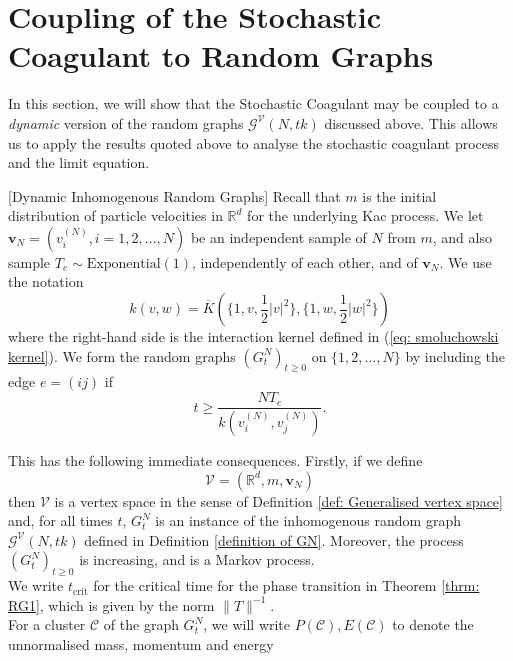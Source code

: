 \section{Coupling of the Stochastic Coagulant to Random Graphs} \label{sec: coupling_to_random_graph}
In this section, we will show that the Stochastic Coagulant may be coupled to a \emph{dynamic} version of the random graphs $\mathcal{G}^\mathcal{V}(N,tk)$ discussed above. This allows us to apply the results quoted above to analyse the stochastic coagulant process and the limit equation.
\begin{definition}\label{def: GNT}[Dynamic Inhomogenous Random Graphs] Recall that $m$ is the initial distribution of particle velocities in $\mathbb{R}^d$ for the underlying Kac process. We let $\mathbf{v}_N=(v^{(N)}_i, i=1,2,...,N)$ be an independent sample of $N$ from $m$, and also sample $T_e \sim \text{Exponential}(1)$, independently of each other, and of $\mathbf{v}_N$. We use the notation \begin{equation} k(v,w)=\overline{K}\left(\{1,v, \frac{1}{2}|v|^2\},\{1,w, \frac{1}{2}|w|^2\}\right) \end{equation} where the right-hand side is the interaction kernel defined in (\ref{eq: smoluchowski kernel}). We form the random graphs $(G^N_t)_{t \ge 0}$ on $\{1,2,...,N\}$ by including the edge $e=(ij)$ if \begin{equation}
    t\ge \frac{N T_e}{k\left(v^{(N)}_i,v^{(N)}_j\right)}.
\end{equation}  \end{definition} This has the following immediate consequences. Firstly, if we define \begin{equation} \mathcal{V}=(\mathbb{R}^d, m, \mathbf{v}_N)\end{equation} then $\mathcal{V}$ is a vertex space in the sense of Definition \ref{def: Generalised vertex space} and, for all times $t$, $G^N_t$ is an instance of the inhomogenous random graph $\mathcal{G}^{\mathcal{V}}(N, tk)$ defined in Definition \ref{definition of GN}. Moreover, the process $(G^N_t)_{t\ge 0}$ is increasing, and is a Markov process. \medskip \\  We write $t_\mathrm{crit}$ for the critical time for the phase transition in Theorem \ref{thrm: RG1}, which is given by the norm $\|T\|^{-1}$. \medskip \\ For a cluster $\mathcal{C}$ of the graph $G^N_t$, we will write $P(\mathcal{C}), E(\mathcal{C})$ to denote the unnormalised mass, momentum and energy \begin{equation}

\end{equation}
